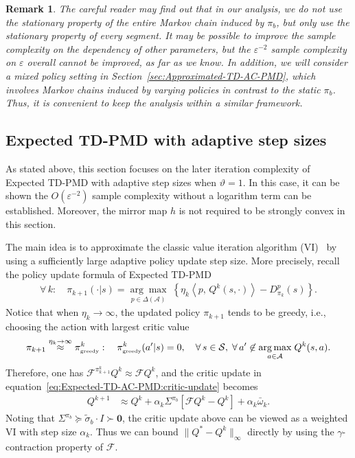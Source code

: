 \documentclass[10pt]{article}
\newcommand{\calA}{\mathcal{A}}
\newcommand{\calS}{\mathcal{S}}
\newcommand{\calF}{\mathcal{F}}
\newcommand{\ls}{\left}
\newcommand{\rs}{\right}
\theoremstyle{plain}
\newtheorem{remark}{Remark}[section]
\theoremstyle{definition}
\begin{document}
\begin{remark}
\label{rem:entire-mixing}
    The careful reader may find out that in our analysis, we do not use the stationary property of the entire Markov chain induced by $\pi_b$, but only use the stationary property of every segment. 
    It may be possible to improve the sample complexity on the dependency of other parameters, but the $\varepsilon^{-2}$ sample complexity on $\varepsilon$ overall cannot be improved, as far as we know. In addition, we will consider a mixed policy setting in Section~\ref{sec:Approximated-TD-AC-PMD}, which involves Markov chains induced by varying policies in contrast to the static $\pi_b$. Thus, it is convenient to keep the analysis within a similar framework.
\end{remark}

\subsection{Expected TD-PMD with adaptive step sizes}
\label{sec:Expected-TD-AC-PMD-with-adaptive-step-size}
As stated above, this section focuses on the later iteration complexity of Expected TD-PMD with adaptive step sizes when $\vartheta=1$. In this case, it can be shown the $O(\varepsilon^{-2})$ sample complexity without a logarithm term can be established. Moreover, the mirror map $h$ is not required to be strongly convex in this section. 

 The main idea is to approximate the classic value iteration algorithm (VI)~\citep{suttonRL} by using a sufficiently large adaptive policy update step size. More precisely, recall the policy  update formula of Expected TD-PMD
\begin{align*}
    \forall\, k: \quad \pi_{k+1}(\cdot|s) = \underset{p\in\Delta(\calA)}{\arg\max} \; \ls\{ \eta_k \ls\langle p, \, Q^k(s,\cdot) \rs\rangle - D^{p}_{\pi_k}(s) \rs\}.
\end{align*}
Notice that when $\eta_k \to \infty$, the updated policy $\pi_{k+1}$ tends to be greedy, i.e., choosing the action with largest critic value
\begin{align*}
    \pi_{k+1} \stackrel{\eta_k\to\infty}{\approx} \pi^k_{\mbox{\tiny greedy}}: \quad \pi_{\mbox{\tiny greedy}}^k(a^\prime|s) = 0 , \quad \forall\, s\in\calS, \;\forall\, a^\prime \not\in\underset{a\in\calA}{\arg\max} \; Q^k(s,a).
\end{align*}
Therefore, one has $\calF^{\pi^k_{k+1}} Q^k \approx\calF Q^k$, and the critic update in equation~\eqref{eq:Expected-TD-AC-PMD:critic-update} becomes
\begin{align*}
     Q^{k+1} &\approx Q^k + \alpha_k \Sigma^{\pi_b} \ls[ \calF Q^k - Q^k \rs] + \alpha_k \bar\omega_k.
\end{align*}
Noting that $\Sigma^{\pi_b} \succeq \tilde\sigma_b \cdot I \succ \mathbf{0}$, the critic update above can be viewed as a weighted VI with step size $\alpha_k$.  Thus we can  bound $\| Q^* - Q^k \|_\infty$ directly by using the $\gamma$-contraction property of $\calF$. 
\end{document}
